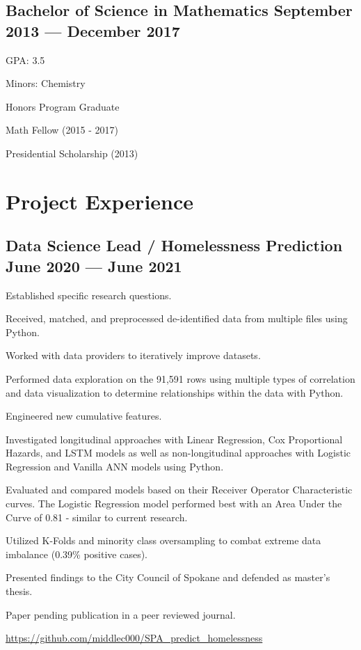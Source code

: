 \documentclass[letter,10pt]{article}
\begin{document}
\subsection{{Bachelor of Science in Mathematics \hfill September 2013 --- December 2017}}
\begin{zitemize}
    \item GPA: 3.5
    \item Minors: Chemistry
    \item Honors Program Graduate
    \item Math Fellow (2015 - 2017)
    \item Presidential Scholarship (2013)
\end{zitemize}

\section{Project Experience}
\subsection{{Data Science Lead / Homelessness Prediction \hfill June 2020 --- June 2021}}
\begin{zitemize}
    \item Established specific research questions.
    \item Received, matched, and preprocessed de-identified data from multiple files using Python.
    \item Worked with data providers to iteratively improve datasets.
    \item Performed data exploration on the 91,591 rows using multiple types of correlation and data visualization to determine relationships within the data with Python.
    \item Engineered new cumulative features.
    \item Investigated longitudinal approaches with Linear Regression, Cox Proportional Hazards, and LSTM models as well as non-longitudinal approaches with Logistic Regression and Vanilla ANN models using Python.
    \item Evaluated and compared models based on their Receiver Operator Characteristic curves. The Logistic Regression model performed best with an Area Under the Curve of 0.81 - similar to current research.
    \item Utilized K-Folds and minority class oversampling to combat extreme data imbalance (0.39\% positive cases).
    \item Presented findings to the City Council of Spokane and defended as master's thesis. 
    \item Paper pending publication in a peer reviewed journal.
    \item \url{https://github.com/middlec000/SPA_predict_homelessness}
\end{zitemize}
\end{document}
